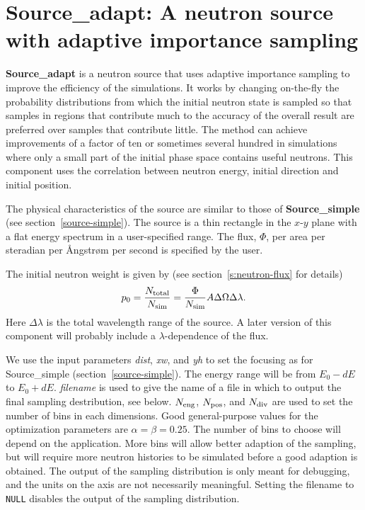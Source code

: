 \section{Source\_adapt: A neutron source with adaptive importance sampling}
\label{s:Source_adapt}
\label{s:source-adapt}


{\bf Source\_adapt} is a neutron source that uses adaptive
importance sampling to improve the efficiency of the simulations. It
works by changing on-the-fly the probability distributions from which
the initial neutron state is sampled so that samples in regions that
contribute much to the accuracy of the overall result are preferred over
samples that contribute little. The method can achieve improvements of a
factor of ten or sometimes several hundred in simulations where only a
small part of the initial phase space contains useful neutrons.
This component uses the correlation between neutron energy, 
initial direction and initial position.

The physical characteristics of the source are similar to those of
{\bf Source\_simple} (see section~\ref{source-simple}). The source is a thin
rectangle in the $x$-$y$ plane with a flat energy spectrum in a
user-specified range. The flux, $\Phi$, per area per steradian per
{\AA}ngstr{\o}m per second is specified by the user.

The initial neutron weight is given by
(see section~\ref{s:neutron-flux} for details)
\begin{equation}
    p_0 = \frac{N_{\rm total}}{N_{\rm sim}} =
    \frac{\Phi}{N_{\rm sim}} A \Delta\Omega \Delta\lambda .
\end{equation}
Here $\Delta\lambda$ is the total wavelength range of the source.
A later version of this component will probably include a
$\lambda$-dependence of the flux.

We use the input parameters \textit{dist}, \textit{xw}, and \textit{yh}
to set the focusing as for Source\_simple (section~\ref{source-simple}).
The energy range will be from $E_0 - dE$ to $E_0 + dE$.
\textit{filename} is used to give the name of a file in which to
output the final sampling destribution, see below.
$N_{\rm eng}$, $N_{\rm pos}$, and $N_{\rm div}$ 
are used to set the number of bins in each dimensions.
Good general-purpose values for the optimization parameters are
$\alpha = \beta = 0.25$. The number of bins to choose will depend on the
application. More bins will allow better adaption of the sampling, but
will require more neutron histories to be simulated before a good
adaption is obtained. The output of the sampling distribution is only
meant for debugging, and the units on the axis are not necessarily
meaningful. Setting the filename to \verb+NULL+ disables the output of
the sampling distribution.

